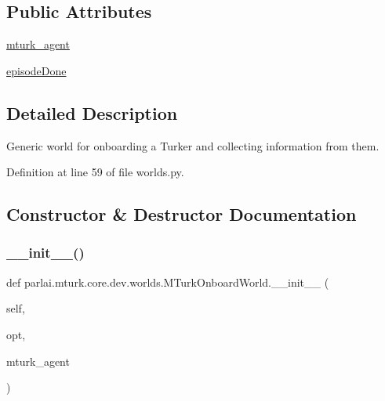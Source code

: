 \subsection*{Public Attributes}
\begin{DoxyCompactItemize}
\item 
\hyperlink{classparlai_1_1mturk_1_1core_1_1dev_1_1worlds_1_1MTurkOnboardWorld_ad7fca9004be424325d8f85100d7684e9}{mturk\+\_\+agent}
\item 
\hyperlink{classparlai_1_1mturk_1_1core_1_1dev_1_1worlds_1_1MTurkOnboardWorld_ad8409ee17d78335e5db64edc552a7969}{episode\+Done}
\end{DoxyCompactItemize}


\subsection{Detailed Description}
\begin{DoxyVerb}Generic world for onboarding a Turker and collecting information from them.
\end{DoxyVerb}
 

Definition at line 59 of file worlds.\+py.



\subsection{Constructor \& Destructor Documentation}
\mbox{\label{classparlai_1_1mturk_1_1core_1_1dev_1_1worlds_1_1MTurkOnboardWorld_ae9bb71f7075a4b244dff5be6c83a312d}} 
\subsubsection{\texorpdfstring{\+\_\+\+\_\+init\+\_\+\+\_\+()}{\_\_init\_\_()}}
{\footnotesize\ttfamily def parlai.\+mturk.\+core.\+dev.\+worlds.\+M\+Turk\+Onboard\+World.\+\_\+\+\_\+init\+\_\+\+\_\+ (\begin{DoxyParamCaption}\item[{}]{self,  }\item[{}]{opt,  }\item[{}]{mturk\+\_\+agent }\end{DoxyParamCaption})}

